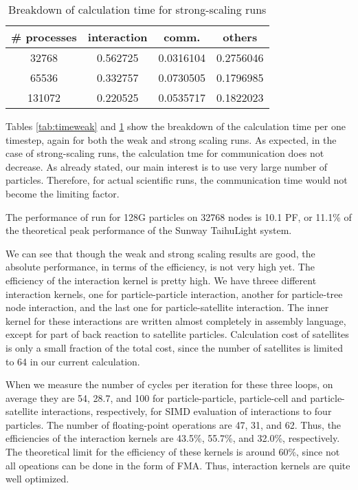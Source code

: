 \documentclass[sigconf]{acmart}
\begin{document}
\begin{table}
  \caption{Breakdown of calculation time for strong-scaling runs}
  \label{tab:timestrong}
  \begin{tabular}{cccc}
    \toprule
    \# processes & interaction & comm. & others\\
    \midrule 
32768   &  0.562725 & 0.0316104 & 0.2756046\\
65536   &  0.332757 & 0.0730505 & 0.1796985\\
131072  &  0.220525 & 0.0535717 & 0.1822023\\
  \bottomrule
\end{tabular}
\end{table}

Tables  \ref{tab:timeweak} and  \ref{tab:timestrong}
  show the breakdown of the calculation time per one
timestep, again for both the weak and strong scaling runs. As
expected, in the case of strong-scaling runs, the calculation  tme for
communication does not decrease. As already stated, our main interest is to
use very large number of particles. Therefore, for actual scientific
runs, the communication time  would not become the limiting
factor.

The performance of run for 128G particles on 32768 nodes is 10.1 PF, or
11.1\% of the theoretical peak performance of the Sunway TaihuLight
system.


We can see that though the weak and strong scaling results are good,
the absolute performance, in terms of the efficiency, is not very high
yet. The efficiency of the interaction kernel is pretty high. We have
threee different interaction kernels, one for particle-particle
interaction, another for particle-tree node interaction, and the last
one for particle-satellite interaction. The inner kernel for these
interactions are written almost completely in assembly language,
except for part of back reaction to satellite particles. Calculation
cost of satellites is only a small fraction of the total cost, since
the number of satellites is limited to 64 in our current calculation.

When we measure the number of cycles per iteration for these three
loops, on average they are  54, 28.7, and 100 for particle-particle,
particle-cell and particle-satellite interactions, respectively, for
SIMD evaluation of interactions to four particles.  The
number of floating-point operations are 47, 31, and 62. Thus, the
efficiencies of the interaction kernels are 43.5\%, 55.7\%, and 32.0\%,
respectively. The theoretical limit for the efficiency of these
kernels is around 60\%, since not all opeations can be done in the
form of FMA.  Thus, interaction kernels are quite well optimized.
\end{document}
